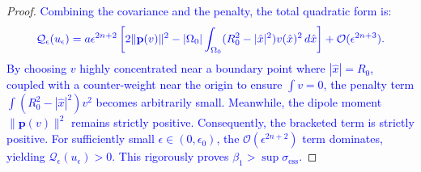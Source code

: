 \documentclass[12pt, a4paper]{article}
\newcommand{\revision}[1]{\textcolor{blue}{#1}}
\theoremstyle{break}
\theoremstyle{break}
\theoremstyle{break}
\theoremstyle{break}
\theoremstyle{break}
\theoremstyle{break}
\theoremstyle{break}
\theoremstyle{break}
\theoremstyle{break}
\begin{document}
\begin{proof}
    \revision{Combining the covariance and the penalty, the total quadratic form is:}
    \begin{equation} \label{eq:total_quadratic_form}
        \revision{\mathcal{Q}_\epsilon(u_\epsilon) = a\epsilon^{2n+2} \left[ 2 \| \mathbf{p}(v) \|^2 - |\Omega_0| \int_{\Omega_0} (R_0^2 - |\hat{x}|^2) v(\hat{x})^2 \,d\hat{x} \right] + \mathcal{O}(\epsilon^{2n+3}).}
    \end{equation}
    \revision{By choosing $v$ highly concentrated near a boundary point where $|\hat{x}| = R_0$, coupled with a counter-weight near the origin to ensure $\int v = 0$, the penalty term $\int (R_0^2 - |\hat{x}|^2) v^2$ becomes arbitrarily small. Meanwhile, the dipole moment $\| \mathbf{p}(v) \|^2$ remains strictly positive. Consequently, the bracketed term is strictly positive. For sufficiently small $\epsilon \in (0, \epsilon_0)$, the $\mathcal{O}(\epsilon^{2n+2})$ term dominates, yielding $\mathcal{Q}_\epsilon(u_\epsilon) > 0$. This rigorously proves $\beta_1 > \sup \sigma_{\mathrm{ess}}$.}
\end{proof}
\end{document}
